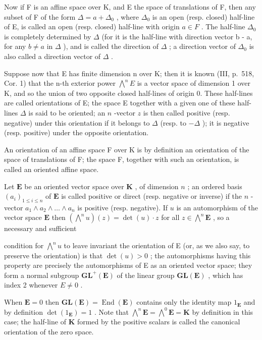 Now if F is an affine space over K, and E the space of translations of F, then any subset of F of the form \(\Delta = a + \Delta_{0}\) , where \(\Delta_{0}\) is an open (resp. closed) half-line of E, is called an open (resp. closed) half-line with origin \(a \in F\) . The half-line \(\Delta_{0}\) is completely determined by \(\Delta\) (for it is the half-line with direction vector b - a, for any \(b \neq a\) in \(\Delta\) ), and is called the direction of \(\Delta\) ; a direction vector of \(\Delta_{0}\) is also called a direction vector of \(\Delta\) .

Suppose now that E has finite dimension n over K; then it is known (III, p.~518, Cor. 1) that the n-th exterior power \(\bigwedge^{n}E\) is a vector space of dimension 1 over K, and so the union of two opposite closed half-lines of origin 0. These half-lines are called orientations of E; the space E together with a given one of these half-lines \(\Delta\) is said to be oriented; an \(n\) -vector \(z\) is then called positive (resp. negative) under this orientation if it belongs to \(\Delta\) (resp. to \(-\Delta\) ); it is negative (resp. positive) under the opposite orientation.

An orientation of an affine space F over K is by definition an orientation of the space of translations of F; the space F, together with such an orientation, is called an oriented affine space.

Let \(\mathbf{E}\) be an oriented vector space over \(\mathbf{K}\) , of dimension \(n\) ; an ordered basis \((a_i)_{1 \leqslant i \leqslant n}\) of \(\mathbf{E}\) is called positive or direct (resp. negative or inverse) if the \(n\) -vector \(a_1 \wedge a_2 \wedge \ldots \wedge a_n\) is positive (resp. negative). If \(u\) is an automorphism of the vector space \(\mathbf{E}\) then \((\bigwedge^{n} u)(z) = \det(u) \cdot z\) for all \(z \in \bigwedge^{n} \mathbf{E}\) , so a necessary and sufficient

condition for \(\bigwedge^{n} u\) to leave invariant the orientation of E (or, as we also say, to preserve the orientation) is that \(\det(u) > 0\) ; the automorphisms having this property are precisely the automorphisms of E as an oriented vector space; they form a normal subgroup \(\mathbf{GL}^{+}(\mathbf{E})\) of the linear group \(\mathbf{GL}(\mathbf{E})\) , which has index 2 whenever \(E \neq 0\) .

When \(\mathbf{E} = 0\) then \(\mathbf{GL}(\mathbf{E}) = \operatorname{End}(\mathbf{E})\) contains only the identity map \(1_{\mathbf{E}}\) and by definition \(\det(1_{\mathbf{E}}) = 1\) . Note that \(\bigwedge^{n}\mathbf{E} = \bigwedge^{0}\mathbf{E} = \mathbf{K}\) by definition in this case; the half-line of \(\mathbf{K}\) formed by the positive scalars is called the canonical orientation of the zero space.

